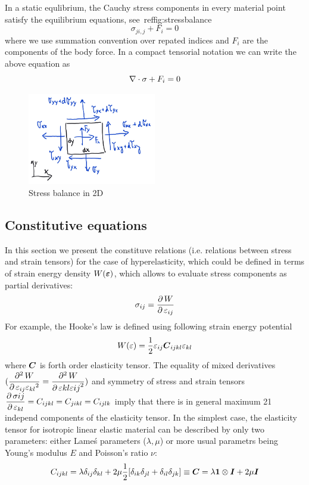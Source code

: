 In a static equlibrium, the Cauchy stress components in every material point satisfy the equilibrium equations, see~ref{fig:stressbalance}
\begin{equation}
  \sigma_{ji, j} + F_i = 0
\end{equation}
where we use summation convention over repated indices and $F_i$ are the components of the body force. In a compact tensorial notation we can write the above equation as
\begin{equation}
  \nabla\cdot\sigma + F_i = 0
  \label{eq:staticequlibruim3d}
\end{equation}

\begin{figure}
  \begin{center}
    \includegraphics[width=0.5\textwidth]{figs/stressbalance2d.png}
  \end{center}
  \label{fig:stressbalance}
  \caption{Stress balance in 2D}
\end{figure}

\subsection{Constitutive equations}
In this section we present the constituve relations (i.e. relations between stress and strain tensors) for the case of hyperelasticity, which could be defined in terms of strain energy density $W(\mbox{\boldmath$\varepsilon$})$, which allows to evaluate stress components as partial derivatives:
$$
\sigma_{ij}=\mbox{$\displaystyle\frac{\partial \,{W}}{\partial \,{\varepsilon_{ij}}}$}
$$
For example, the Hooke's law  is defined using following strain energy potential
$$
W(\varepsilon) = \mbox{$\displaystyle\frac{1}{2}$}\varepsilon_{ij}\mbox{\boldmath$C$}_{ijkl}\varepsilon_{kl}
$$
where $\mbox{\boldmath$C$}$ is forth order elasticity tensor. The equality of mixed derivatives $(\mbox{$\displaystyle\frac{\partial ^{2}\,{W}}{\partial \,{\varepsilon_{ij}\varepsilon_{kl}}^{2}}$} = \mbox{$\displaystyle\frac{\partial ^{2}\,{W}}{\partial \,{\varepsilon{kl}\varepsilon{ij}}^{2}}$})$ and symmetry of stress and strain tensors $\mbox{$\displaystyle\frac{\partial \,{\sigma{ij}}}{\partial \,{\varepsilon_{kl}}}$} = C_{ijkl}=C_{jikl}=C_{ijlk}$ imply that there is in general maximum 21 independ components of the elasticity tensor.
In the simplest case, the elasticity tensor for isotropic linear elastic material  can be described by only two parameters: either Lame\'s parameters ($\lambda, \mu$) or more usual parametrs being Young's modulus $E$ and Poisson's ratio $\nu$:
$$
C_{ijkl}=\lambda\delta_{ij}\delta_{kl}+2\mu {1\over 2}[\delta_{ik}\delta_{jl}+
 \delta_{il}\delta_{jk}] \equiv \mbox{\boldmath$C$}=\lambda\mbox{\boldmath$1$}\otimes\mbox{\boldmath$I$}+2\mu\mbox{\boldmath$I$}
$$

